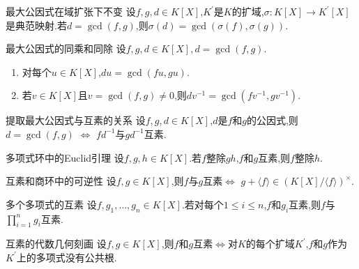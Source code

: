 \begin{corollary}{最大公因式在域扩张下不变}{}
	设$f,g,d\in K\left[X\right]$,$K^{\prime}$是$K$的扩域,$\sigma:K\left[X\right]\to K^{\prime}\left[X\right]$是典范映射.若$d=\gcd\left(f,g\right)$,则$\sigma\left(d\right)=\gcd\left(\sigma\left(f\right),\sigma\left(g\right)\right)$.
\end{corollary}

\begin{corollary}{最大公因式的同乘和同除}{}
	设$f,g,d\in K\left[X\right],d=\gcd\left(f,g\right)$.
	\begin{enumerate}
		\item 对每个$u\in K\left[X\right]$,$du=\gcd\left(fu,gu\right)$.
		\item 若$v\in K\left[X\right]$且$v=\gcd\left(f,g\right)\neq 0$,则$dv^{-1}=\gcd\left(fv^{-1},gv^{-1}\right)$.
	\end{enumerate}
\end{corollary}

\begin{corollary}{提取最大公因式与互素的关系}{}
	设$f,g,d\in K\left[X\right]$,$d$是$f$和$g$的公因式,则$d=\gcd\left(f,g\right)$ $\iff$ $fd^{-1}$与$gd^{-1}$互素.
\end{corollary}

\begin{corollary}{多项式环中的Euclid引理}{}
	设$f,g,h\in K\left[X\right]$.若$f$整除$gh$,$f$和$g$互素,则$f$整除$h$.
\end{corollary}

\begin{corollary}{互素和商环中的可逆性}{}
	设$f,g\in K\left[X\right]$,则$f$与$g$互素$\iff$ $g+\langle f\rangle\in\left(K\left[X\right]/\langle f\rangle\right)^{\times}$.
\end{corollary}

\begin{corollary}{多个多项式的互素}{}
	设$f,g_{1},\ldots,g_{n}\in K\left[X\right]$.若对每个$1\leq i\leq n$,$f$和$g_{i}$互素,则$f$与$\prod\limits_{i=1}^{n}g_{i}$互素.
\end{corollary}

\begin{corollary}{互素的代数几何刻画}{}
	设$f,g\in K\left[X\right]$,则$f$和$g$互素$\iff$对$K$的每个扩域$K^{\prime}$,$f$和$g$作为$K^{\prime}$上的多项式没有公共根.
\end{corollary}




















